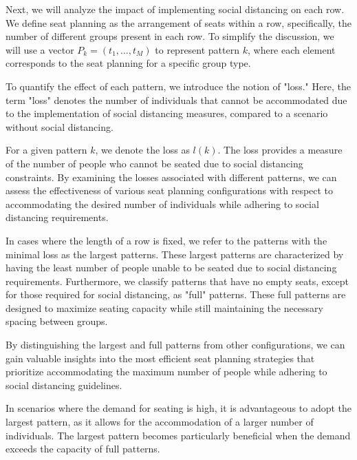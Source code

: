 

Next, we will analyze the impact of implementing social distancing on each row. We define seat planning as the arrangement of seats within a row, specifically, the number of different groups present in each row. To simplify the discussion, we will use a vector $P_k = (t_1, \ldots, t_M)$ to represent pattern $k$, where each element corresponds to the seat planning for a specific group type.

To quantify the effect of each pattern, we introduce the notion of "loss." Here, the term "loss" denotes the number of individuals that cannot be accommodated due to the implementation of social distancing measures, compared to a scenario without social distancing.

For a given pattern $k$, we denote the loss as $l(k)$. The loss provides a measure of the number of people who cannot be seated due to social distancing constraints. By examining the losses associated with different patterns, we can assess the effectiveness of various seat planning configurations with respect to accommodating the desired number of individuals while adhering to social distancing requirements. 

In cases where the length of a row is fixed, we refer to the patterns with the minimal loss as the largest patterns. These largest patterns are characterized by having the least number of people unable to be seated due to social distancing requirements. Furthermore, we classify patterns that have no empty seats, except for those required for social distancing, as "full" patterns. These full patterns are designed to maximize seating capacity while still maintaining the necessary spacing between groups.

By distinguishing the largest and full patterns from other configurations, we can gain valuable insights into the most efficient seat planning strategies that prioritize accommodating the maximum number of people while adhering to social distancing guidelines.

In scenarios where the demand for seating is high, it is advantageous to adopt the largest pattern, as it allows for the accommodation of a larger number of individuals. The largest pattern becomes particularly beneficial when the demand exceeds the capacity of full patterns.

